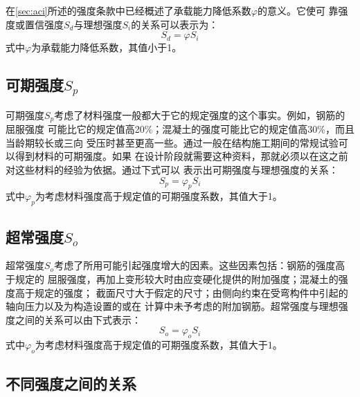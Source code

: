 \documentclass[12pt,a4paper]{book}
\begin{document}
在\cref{sec:aci}所述的强度条款中已经概述了承载能力降低系数$\varphi$的意义。它使可
靠强度或置信强度$S_d$与理想强度$S_i$的关系可以表示为：
\begin{equation}
  \label{eq:5} S_d=\varphi S_i
\end{equation}式中$\varphi$为承载能力降低系数，其值小于1。

\subsection{可期强度$S_p$}

可期强度$S_p$考虑了材料强度一般都大于它的规定强度的这个事实。例如，钢筋的屈服强度
可能比它的规定值高20\%；混凝土的强度可能比它的规定值高30\%，而且当龄期较长或三向
受压时甚至更高一些。通过一般在结构施工期间的常规试验可以得到材料的可期强度。如果
在设计阶段就需要这种资料，那就必须以在这之前对这些材料的经验为依据。通过下式可以
表示出可期强度与理想强度的关系：
\begin{equation}
  \label{eq:6} S_p=\varphi_p S_i
\end{equation}式中$\varphi_p$为考虑材料强度高于规定值的可期强度系数，其值大于1。

\subsection{超常强度$S_o$}
\label{sec:s_o}

超常强度$S_o$考虑了所用可能引起强度增大的因素。这些因素包括：钢筋的强度高于规定的
屈服强度，再加上变形较大时由应变硬化提供的附加强度；混凝土的强度高于规定的强度；
截面尺寸大于假定的尺寸；由侧向约束在受弯构件中引起的轴向压力以及为构造设置的或在
计算中未予考虑的附加钢筋。超常强度与理想强度之间的关系可以由下式表示：
\begin{equation}
  \label{eq:7} S_o=\varphi_o S_i
\end{equation}式中$\varphi_o$为考虑材料强度高于规定值的可期强度系数，其值大于1。

\subsection{不同强度之间的关系}
\end{document}
